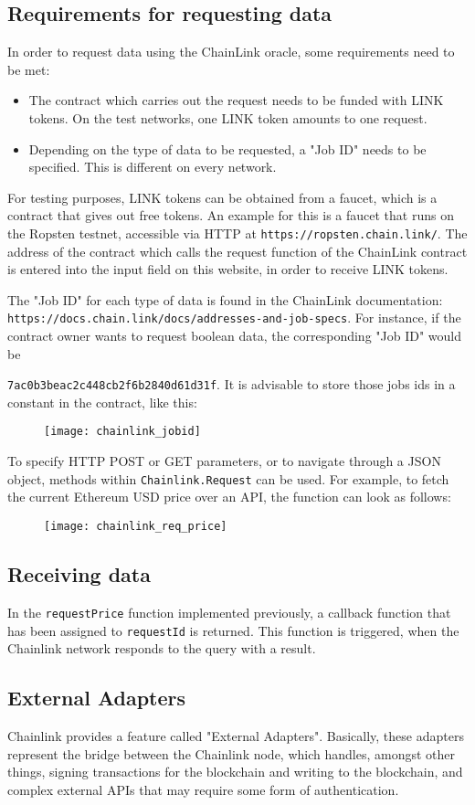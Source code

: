 \subsection*{Requirements for requesting data}
In order to request data using the ChainLink oracle, some requirements need to be met:
\begin{itemize}
	\item The contract which carries out the request needs to be funded with  LINK tokens. On the test networks, one LINK token amounts to one request.
	\item Depending on the type of data to be requested, a "Job ID" needs to be specified. This is different on every network.
\end{itemize}
For testing purposes, LINK tokens can be obtained from a faucet, which is a contract that gives out free tokens. An example for this is a faucet that runs on the Ropsten testnet, accessible via HTTP at \texttt{https://ropsten.chain.link/}. The address of the contract which calls the request function of the ChainLink contract is entered into the input field on this website, in order to receive LINK tokens.

The "Job ID" for each type of data is found in the ChainLink documentation: \texttt{https://docs.chain.link/docs/addresses-and-job-specs}. For instance, if the contract owner wants to request boolean data, the corresponding "Job ID" would be
 
\texttt{7ac0b3beac2c448cb2f6b2840d61d31f}. It is advisable to store those jobs ids in a constant in the contract, like this:
\begin{figure}[H]
\texttt{[image: chainlink\_jobid]}
\end{figure}
To specify HTTP POST or GET parameters, or to navigate through a JSON object, methods within \texttt{Chainlink.Request} can be used. For example, to fetch the current Ethereum USD price over an API, the function can look as follows:
\begin{figure}[H]
\texttt{[image: chainlink\_req\_price]}
\end{figure}
\subsection*{Receiving data}
In the \texttt{requestPrice} function implemented previously, a callback function that has been assigned to \texttt{requestId} is returned. This function is triggered, when the Chainlink network responds to the query with a result. 
\subsection*{External Adapters}
Chainlink provides a feature called "External Adapters". Basically, these adapters represent the bridge between the Chainlink node, which handles, amongst other things, signing transactions for the blockchain and writing to the blockchain, and complex external APIs that may require some form of authentication.

